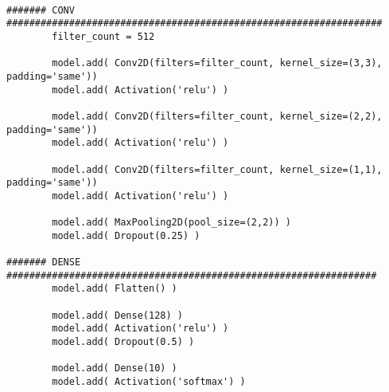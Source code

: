 \begin{verbatim}

####### CONV ##################################################################
        filter_count = 512

        model.add( Conv2D(filters=filter_count, kernel_size=(3,3), padding='same'))
        model.add( Activation('relu') )

        model.add( Conv2D(filters=filter_count, kernel_size=(2,2), padding='same'))
        model.add( Activation('relu') )

        model.add( Conv2D(filters=filter_count, kernel_size=(1,1), padding='same'))
        model.add( Activation('relu') )

        model.add( MaxPooling2D(pool_size=(2,2)) )
        model.add( Dropout(0.25) )

####### DENSE #################################################################
        model.add( Flatten() )

        model.add( Dense(128) )
        model.add( Activation('relu') )
        model.add( Dropout(0.5) )

        model.add( Dense(10) )
        model.add( Activation('softmax') )
  
\end{verbatim}
